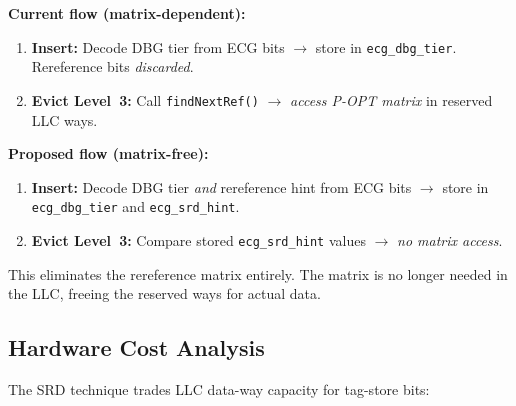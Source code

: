 \documentclass[conference]{IEEEtran}
\begin{document}
\textbf{Current flow (matrix-dependent):}
\begin{enumerate}[topsep=2pt,itemsep=0pt,wide]
    \item \textbf{Insert:} Decode DBG tier from ECG bits $\rightarrow$ store in \texttt{ecg\_dbg\_tier}. Rereference bits \emph{discarded}.
    \item \textbf{Evict Level~3:} Call \texttt{findNextRef()} $\rightarrow$ \emph{access P-OPT matrix} in reserved LLC ways.
\end{enumerate}

\textbf{Proposed flow (matrix-free):}
\begin{enumerate}[topsep=2pt,itemsep=0pt,wide]
    \item \textbf{Insert:} Decode DBG tier \emph{and} rereference hint from ECG bits $\rightarrow$ store in \texttt{ecg\_dbg\_tier} and \texttt{ecg\_srd\_hint}.
    \item \textbf{Evict Level~3:} Compare stored \texttt{ecg\_srd\_hint} values $\rightarrow$ \emph{no matrix access}.
\end{enumerate}

This eliminates the rereference matrix entirely. The matrix is no longer needed in the LLC, freeing the reserved ways for actual data.

\subsection{Hardware Cost Analysis}

The SRD technique trades LLC data-way capacity for tag-store bits:

\begin{table}[t]
\centering
\caption{Hardware cost comparison: P-OPT matrix vs.\ ECG Embedded Oracle}
\label{table:hw_cost}
\end{table}
\end{document}
